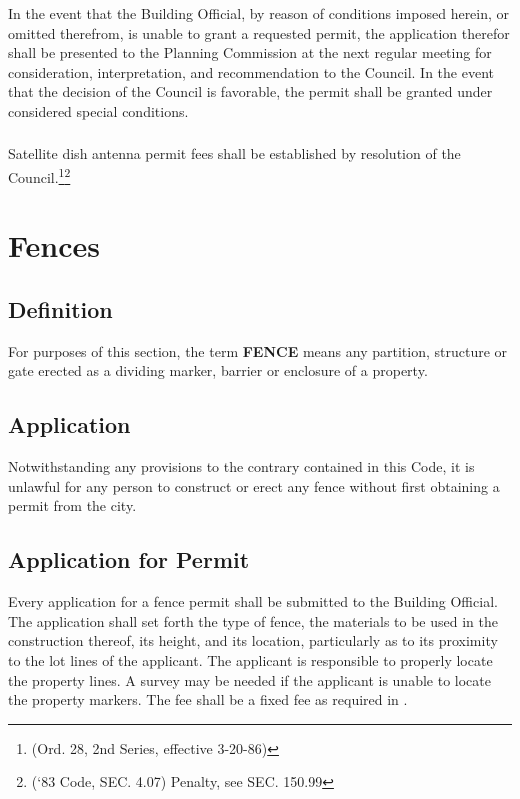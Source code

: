\subsubsection{}
In the event that the Building Official, by reason of conditions imposed herein, or omitted therefrom, is unable to grant a requested permit, the application therefor shall be presented to the Planning Commission at the next regular meeting for consideration, interpretation, and recommendation to the Council.  In the event that the decision of the Council is favorable, the permit shall be granted under considered special conditions.
\subsubsection{}
Satellite dish antenna permit fees shall be established by resolution of the Council.\footnote{(Ord. 28, 2nd Series, effective 3-20-86)}\footnote{(‘83 Code, SEC. 4.07)  Penalty, see SEC. 150.99}

\section{Fences}
\subsection{Definition}
For purposes of this section, the term \textbf{FENCE} means any partition, structure or gate erected as a dividing marker, barrier or enclosure of a property.
\subsection{Application}
Notwithstanding any provisions to the contrary contained in this Code, it is unlawful for any person to construct or erect any fence without first obtaining a permit from the city.
\subsection{Application for Permit}
Every application for a fence permit shall be submitted to the Building Official.  The application shall set forth the type of fence, the materials to be used in the construction thereof, its height, and its location, particularly as to its proximity to the lot lines of the applicant.  The applicant is responsible to properly locate the property lines.  A survey may be needed if the applicant is unable to locate the property markers.  The fee shall be a fixed fee as required in .

